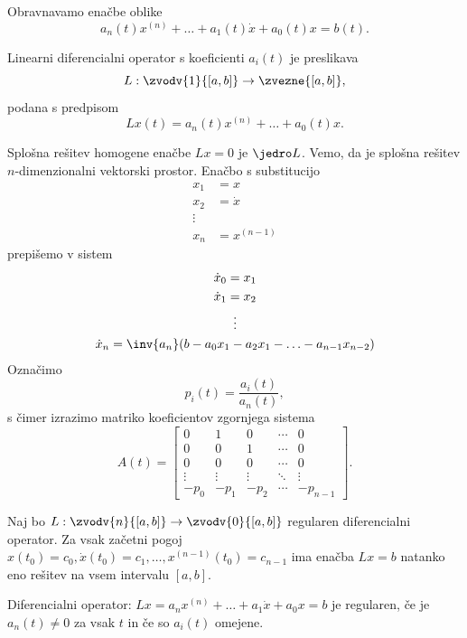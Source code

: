 
Obravnavamo enačbe oblike
\[
  a_n(t) x^{(n)} + \ldots + a_1(t) \dot{x} + a_0(t) x = b(t).
\]

\begin{definicija}
  Linearni diferencialni operator s koeficienti $a_i(t)$ je preslikava
  \[
	L : \zvodv{1}{[a,b]} \to \zvezne{[a,b]},
  \]
  podana s predpisom
  \[
	Lx(t) = a_n(t) x^{(n)} + \ldots + a_0(t) x.
  \]
\end{definicija}

Splošna rešitev homogene enačbe $Lx = 0$ je $\jedro L$.
Vemo, da je splošna rešitev $n$-dimenzionalni vektorski prostor.
Enačbo s substitucijo
\begin{align*}
  x_1 &= x \\
  x_2 &= \dot{x} \\
  \vdots & \\
  x_n &= x^{(n-1)}
\end{align*}
prepišemo v sistem
\begin{gather*}
  \dot{x}_0 = x_1 \\
  \dot{x}_1 = x_2 \\
  \vdots \\
  \dot{x}_n = \inv{a_n} (b - a_0 x_1 - a_2 x_1 - \ldots - a_{n-1} x_{n-2})
\end{gather*}
Označimo
\[
  p_i(t) = \frac{a_i(t)}{a_n(t)},
\]
s čimer izrazimo matriko koeficientov zgornjega sistema
\[
  A(t) =
  \begin{bmatrix}
	0 & 1 & 0 & \cdots & 0 \\
	0 & 0 & 1 & \cdots & 0 \\
	0 & 0 & 0 & \cdots & 0 \\
	\vdots & \vdots & \vdots & \ddots & \vdots \\
	-p_0 & -p_1 & -p_2 & \cdots & -p_{n-1}
  \end{bmatrix}.
\]

\begin{izrek}
  Naj bo $L: \zvodv{n}{[a,b]} \to \zvodv{0}{[a,b]}$ regularen diferencialni
  operator.
  Za vsak začetni pogoj $x(t_0) = c_0, \dot{x}(t_0) = c_1, \ldots,
  x^{(n-1)}(t_0) = c_{n-1}$ ima enačba $Lx = b$ natanko eno rešitev na vsem
  intervalu $[a,b]$.
\end{izrek}

\begin{opomba}
  Diferencialni operator: $Lx = a_n x^{(n)} + \ldots + a_1 \dot{x} +
  a_0 x = b$ je regularen, če je $a_n(t) \ne 0$ za vsak $t$ in če so $a_i(t)$
  omejene.
\end{opomba}

